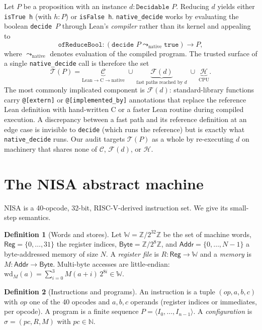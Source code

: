 \documentclass[11pt]{article}
\theoremstyle{definition}
\newtheorem{definition}{Definition}
\theoremstyle{plain}
\theoremstyle{remark}
\newcommand{\Word}{\mathbb{W}}
\newcommand{\Reg}{\mathsf{Reg}}
\newcommand{\Addr}{\mathsf{Addr}}
\newcommand{\Byte}{\mathsf{Byte}}
\newcommand{\N}{\mathbb{N}}
\newcommand{\Z}{\mathbb{Z}}
\begin{document}
Let $P$ be a proposition with an instance $d : \texttt{Decidable } P$. Reducing $d$ yields either
\texttt{isTrue h} (with $h : P$) or \texttt{isFalse h}. \texttt{native\_decide} works by evaluating
the boolean \texttt{decide}~$P$ through Lean's \emph{compiler} rather than its kernel and appealing to
\[
  \texttt{ofReduceBool} : (\texttt{decide } P \leadsto_{\text{native}} \texttt{true}) \to P,
\]
where $\leadsto_{\text{native}}$ denotes evaluation of the compiled program. The trusted surface of a
single \texttt{native\_decide} call is therefore the set
\[
  \mathcal{T}(P) = \underbrace{\mathcal{C}}_{\text{Lean}\to\text{C}\to\text{native}}
                 \;\cup\; \underbrace{\mathcal{F}(d)}_{\text{fast paths reached by }d}
                 \;\cup\; \underbrace{\mathcal{H}}_{\text{CPU}} .
\]
The most commonly implicated component is $\mathcal{F}(d)$: standard-library functions carry
\texttt{@[extern]} or \texttt{@[implemented\_by]} annotations that replace the reference Lean
definition with hand-written C or a faster Lean routine during compiled execution. A discrepancy
between a fast path and its reference definition at an edge case is invisible to \texttt{decide} (which
runs the reference) but is exactly what \texttt{native\_decide} runs. Our audit targets $\mathcal{T}(P)$
as a whole by re-executing $d$ on machinery that shares none of $\mathcal{C}$, $\mathcal{F}(d)$, or
$\mathcal{H}$.

\section{The NISA abstract machine}\label{sec:nisa}

NISA is a 40-opcode, 32-bit, RISC-V-derived instruction set. We give its small-step semantics.

\begin{definition}[Words and stores]
Let $\Word = \Z/2^{32}\Z$ be the set of machine words, $\Reg = \{0,\dots,31\}$ the register indices,
$\Byte = \Z/2^{8}\Z$, and $\Addr = \{0,\dots,N-1\}$ a byte-addressed memory of size $N$. A
\emph{register file} is $R : \Reg \to \Word$ and a \emph{memory} is $M : \Addr \to \Byte$. Multi-byte
accesses are little-endian: $\mathrm{wd}_M(a) = \sum_{i=0}^{3} M(a{+}i)\,2^{8i} \in \Word$.
\end{definition}

\begin{definition}[Instructions and programs]
An instruction is a tuple $(\mathit{op}, a, b, c)$ with $\mathit{op}$ one of the 40 opcodes and
$a,b,c$ operands (register indices or immediates, per opcode). A program is a finite sequence
$P = \langle I_0, \dots, I_{n-1}\rangle$. A \emph{configuration} is $\sigma = (pc, R, M)$ with
$pc \in \N$.
\end{definition}
\end{document}
